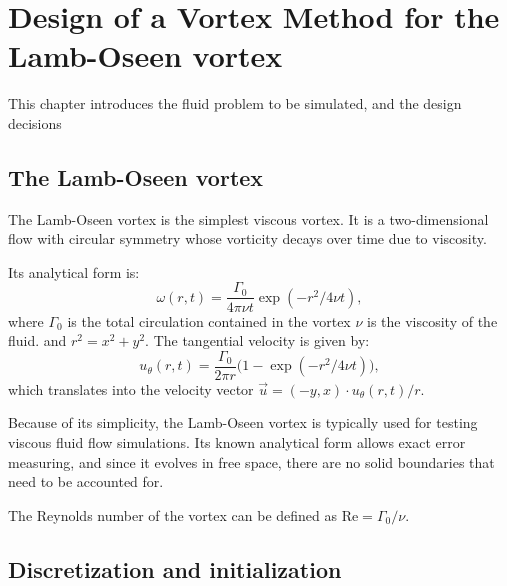 \chapter{Design of a Vortex Method for the Lamb-Oseen vortex}
\label{ch:vm-design}


This chapter introduces the fluid problem to be simulated,
and the design decisions %

\section{The Lamb-Oseen vortex}
\label{sec:lamb-oseen-vortex}

The Lamb-Oseen vortex is the simplest viscous vortex.
It is a two-dimensional flow with circular symmetry
whose vorticity decays over time due to viscosity.

Its analytical form is:
\begin{equation}
  \label{eq:lamb-oseen-vorticity}
  ω(r, t) = \frac{Γ_0}{4πνt} \exp(-r^2/4νt),
\end{equation}
where \(Γ_0\) is the total circulation contained in the vortex
\(ν\) is the viscosity of the fluid.
and \(r^2 = x^2 + y^2\).
The tangential velocity is given by:
\begin{equation}
  \label{eq:lamb-oseen-tangential-velocity}
  u_\theta(r, t) = \frac{Γ_0}{2πr} \bigl(1 - \exp(-r^2/4νt)\bigr),
\end{equation}
which translates into the velocity vector
\(\vec{u} = (-y, x)\cdot u_\theta(r, t)/r \).


Because of its simplicity,
the Lamb-Oseen vortex is typically used
for testing viscous fluid flow simulations.
Its known analytical form allows exact error measuring,
and since it evolves in free space,
there are no solid boundaries that need to be accounted for.

The Reynolds number of the vortex
can be defined as \(\text{Re} = Γ_0/ν\).

\section{Discretization and initialization}
\label{sec:lamb-oseen-discretization}


